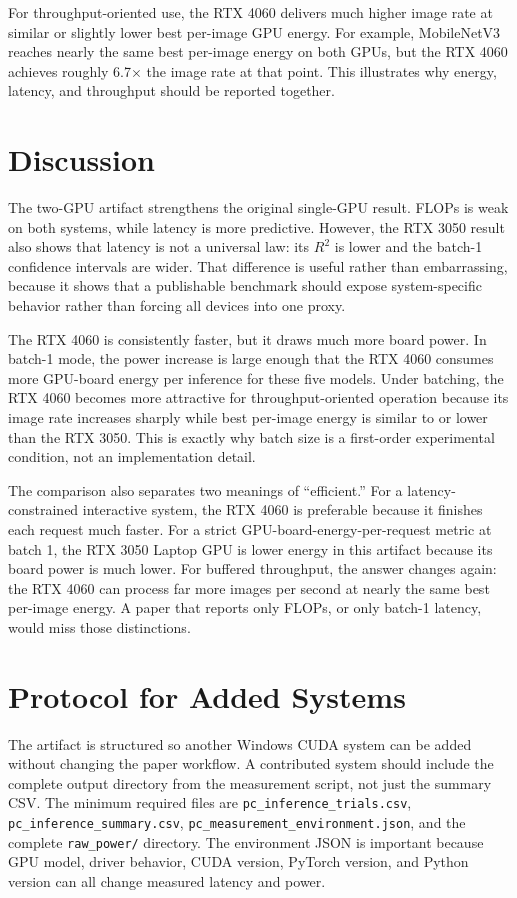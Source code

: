 \documentclass[conference]{IEEEtran}
\begin{document}
For throughput-oriented use, the RTX 4060 delivers much higher image rate at
similar or slightly lower best per-image GPU energy. For example, MobileNetV3
reaches nearly the same best per-image energy on both GPUs, but the RTX 4060
achieves roughly 6.7$\times$ the image rate at that point. This illustrates why
energy, latency, and throughput should be reported together.

\section{Discussion}

The two-GPU artifact strengthens the original single-GPU result. FLOPs is weak
on both systems, while latency is more predictive. However, the RTX 3050 result
also shows that latency is not a universal law: its $R^2$ is lower and the
batch-1 confidence intervals are wider. That difference is useful rather than
embarrassing, because it shows that a publishable benchmark should expose
system-specific behavior rather than forcing all devices into one proxy.

The RTX 4060 is consistently faster, but it draws much more board power. In
batch-1 mode, the power increase is large enough that the RTX 4060 consumes
more GPU-board energy per inference for these five models. Under batching, the
RTX 4060 becomes more attractive for throughput-oriented operation because its
image rate increases sharply while best per-image energy is similar to or
lower than the RTX 3050. This is exactly why batch size is a first-order
experimental condition, not an implementation detail.

The comparison also separates two meanings of ``efficient.'' For a
latency-constrained interactive system, the RTX 4060 is preferable because it
finishes each request much faster. For a strict GPU-board-energy-per-request
metric at batch 1, the RTX 3050 Laptop GPU is lower energy in this artifact
because its board power is much lower. For buffered throughput, the answer
changes again: the RTX 4060 can process far more images per second at nearly
the same best per-image energy. A paper that reports only FLOPs, or only
batch-1 latency, would miss those distinctions.

\section{Protocol for Added Systems}

The artifact is structured so another Windows CUDA system can be added without
changing the paper workflow. A contributed system should include the complete
output directory from the measurement script, not just the summary CSV. The
minimum required files are \texttt{pc\_inference\_trials.csv},
\texttt{pc\_inference\_summary.csv},
\texttt{pc\_measurement\_environment.json}, and the complete
\texttt{raw\_power/} directory. The environment JSON is important because GPU
model, driver behavior, CUDA version, PyTorch version, and Python version can
all change measured latency and power.
\end{document}
